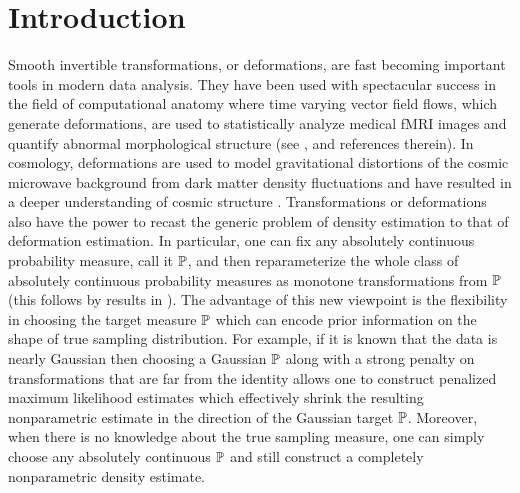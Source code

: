 \documentclass[noinfoline]{imsart}
\begin{document}
\section{Introduction}

\setcounter{page}{1}

  Smooth invertible transformations, or deformations, are fast becoming important tools in modern data analysis.
  They have been used with spectacular success in the field of computational anatomy where time varying vector field flows, which generate deformations, are used to statistically analyze medical fMRI images and quantify abnormal morphological structure
  (see  \cite{alla:07,
 Beg:2006ly,
 conf/miccai/BegMTY03,
  Beg:2005qf,
   cao:05,
   dup:98,
 Grenander:1998:CAE:309082.309089,
 Miller:1999bh,
 Miller:2006zr,
 Miller:2001ve,
 Trouve:1998ys,
 ty:dq,
 vaillant:04,
you:10,
Younes:2008}, and references therein).
  In cosmology, deformations  are used to model gravitational distortions of the cosmic microwave background from  dark matter density fluctuations and have resulted in a deeper understanding of cosmic structure \cite{Das:2011uq}.
Transformations or deformations also have the power
 to recast the generic problem of density estimation to that of deformation estimation.  In particular, one can fix any absolutely continuous probability measure, call it $\Bbb P$, and then reparameterize the whole class of absolutely continuous probability measures as monotone transformations from $\Bbb P$ (this follows by results in \cite{mcc:95}).  The advantage of this new viewpoint is the flexibility in choosing the target measure $\Bbb P$ which can encode  prior information on the shape of true sampling distribution.
 For example, if it is known that the data is nearly Gaussian then choosing a  Gaussian $\Bbb P$  along with a strong penalty on transformations that are far from the identity allows one to construct penalized maximum likelihood estimates which effectively shrink the resulting nonparametric estimate in the direction of the Gaussian target $\Bbb P$. Moreover, when there is no knowledge about the true sampling measure, one can simply choose any absolutely continuous $\Bbb P$ and still construct a completely nonparametric density estimate.
\end{document}
